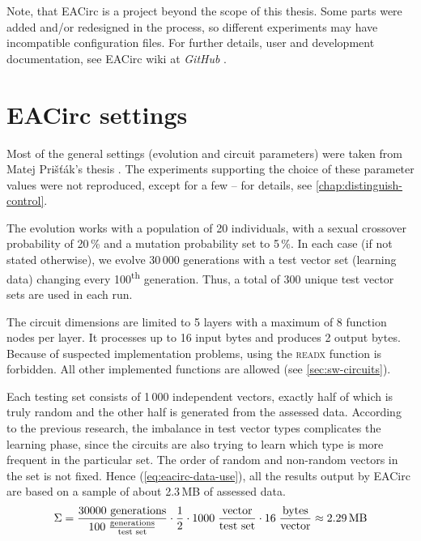 \documentclass[12pt,twoside]{fithesis2}		%
\renewcommand{\_}{\leavevmode \kern0.0em\vbox{\hrule width0.4em}}
\begin{document}
Note, that EACirc is a project beyond the scope of this thesis. Some parts were added and/or redesigned in the process, so
different experiments may have incompatible configuration files.
For further details, user and development documentation, see EACirc wiki at \textit{GitHub} \parencite{eacirc-github}.	

\section{EACirc settings}
\label{sec:settings-eacirc}

Most of the general settings (evolution and circuit parameters) were taken from Matej Prišťák's thesis \parencite{thesis-pristak}. 
The experiments supporting the choice of these parameter values were not reproduced, except for a few -- for details,
see \autoref{chap:distinguish-control}.

The evolution works with a population of 20 individuals, with a sexual crossover probability of 20\,\% and a mutation probability
set to 5\,\%. In each case (if not stated otherwise), we evolve 30\,000 generations with a test vector set
(learning data) changing every 100\textsuperscript{th} generation. Thus, a total of 300 unique test vector sets are used in each run.

The circuit dimensions are limited to 5 layers with a maximum of 8 function nodes per layer. It processes up to 16 input bytes
and produces 2 output bytes. Because of suspected implementation problems, using the \textsc{readx} function is forbidden.
All other implemented functions are allowed (see \autoref{sec:sw-circuits}).

Each testing set consists of 1\,000 independent vectors, exactly half of which is truly random and the other half is
generated from the assessed data.
According to the previous research, the imbalance in test vector types complicates the learning phase, since the circuits
are also trying to learn which type is more frequent in the particular set. 
The order of random and non-random vectors in the set is not fixed.
Hence (\autoref{eq:eacirc-data-use}), all the results output by EACirc are based on a sample of about 2.3\,MB of assessed data.
\begin{equation}
\label{eq:eacirc-data-use}
\Sigma = \frac{30000 \text{ generations}}{100 \; \frac{\text{generations}}{\text{test set}}}
         \cdot \frac{1}{2} \cdot 1000 \; \frac{\text{vector}}{\text{test set}}
         \cdot 16 \; \frac{\text{bytes}}{\text{vector}}
         \approx 2.29 \text{\,MB}
\end{equation}
\end{document}
